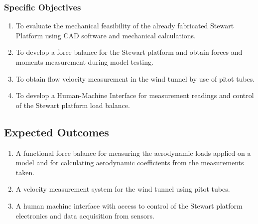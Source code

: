\subsubsection{Specific Objectives}
\begin{enumerate}
\item To evaluate the mechanical feasibility of the already fabricated Stewart Platform using CAD software and mechanical calculations.
\item To develop a force balance for the Stewart platform and obtain forces and moments measurement during model testing.
\item To obtain flow velocity measurement in the wind tunnel by use of pitot tubes.
\item To develop a Human-Machine Interface for measurement readings and control of the Stewart platform load balance.
\end{enumerate}
\subsection{Expected Outcomes}
\begin{enumerate}
\item A functional force balance for measuring the aerodynamic loads applied on a model
and for calculating aerodynamic coefficients from the measurements taken.
\item A velocity measurement system for the wind tunnel using pitot tubes.
\item A human machine interface with access to control of the Stewart platform electronics
and data acquisition from sensors.
\end{enumerate}
